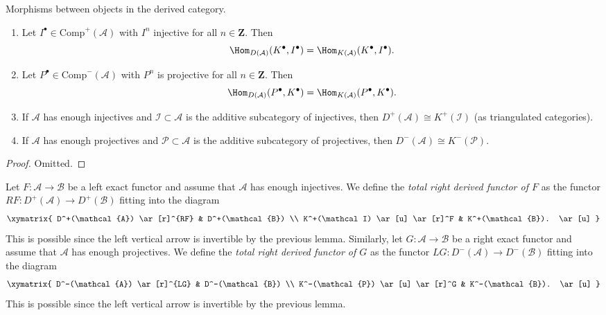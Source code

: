 \begin{lemma}
\label{lemma-derived-categories}
Morphisms between objects in the derived category.
\begin{enumerate}
\item
Let $I^\bullet \in \text{Comp}^+(\mathcal{A})$ with $I^n$ injective for all
$n \in \mathbf{Z}$. Then
$$
\Hom_{D(\mathcal{A})}(K^\bullet, I^\bullet)
=
\Hom_{K(\mathcal{A})}(K^\bullet, I^\bullet).
$$
\item
Let $P^\bullet \in \text{Comp}^-(\mathcal{A})$ with $P^n$ is projective for all
$n \in \mathbf{Z}$. Then
$$
\Hom_{D(\mathcal{A})}(P^\bullet, K^\bullet)
=
\Hom_{K(\mathcal{A})}(P^\bullet, K^\bullet).
$$
\item
If $\mathcal{A}$ has enough injectives and $\mathcal{I} \subset \mathcal{A}$
is the additive subcategory of injectives, then
$
D^+(\mathcal{A})\cong K^+(\mathcal{I})
$
(as triangulated categories).
\item
If $\mathcal{A}$ has enough projectives and $\mathcal{P} \subset \mathcal{A}$
is the additive subcategory of projectives, then
$
D^-(\mathcal{A}) \cong K^-(\mathcal{P}).
$
\end{enumerate}
\end{lemma}

\begin{proof}
Omitted.
\end{proof}

\begin{definition}
\label{definition-derived-functor}
Let $F: \mathcal{A} \to \mathcal{B}$ be a left exact functor and assume that
$\mathcal{A}$ has enough injectives. We define the {\it total right derived
functor of $F$} as the functor $RF: D^+(\mathcal{A}) \to D^+(\mathcal{B})$
fitting into the diagram
$$
\xymatrix{
D^+(\mathcal{A}) \ar[r]^{RF} & D^+(\mathcal{B}) \\
K^+(\mathcal I) \ar[u] \ar[r]^F & K^+(\mathcal{B}). \ar[u]
}
$$
This is possible since the left vertical arrow is invertible by the previous
lemma. Similarly, let $G: \mathcal{A} \to \mathcal{B}$ be a right exact
functor and assume that $\mathcal{A}$ has enough projectives. We define the
{\it total right derived functor of $G$} as the functor $LG: D^-(\mathcal{A})
\to D^-(\mathcal{B})$ fitting into the diagram
$$
\xymatrix{
D^-(\mathcal{A}) \ar[r]^{LG} & D^-(\mathcal{B}) \\
K^-(\mathcal{P}) \ar[u] \ar[r]^G & K^-(\mathcal{B}). \ar[u]
}
$$
This is possible since the left vertical arrow is invertible by the previous
lemma.
\end{definition}

